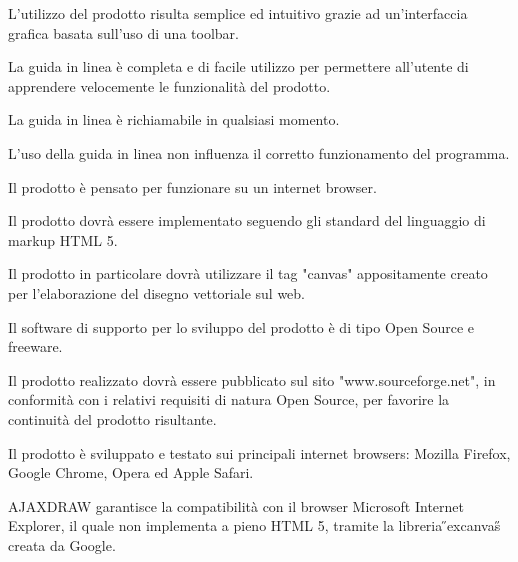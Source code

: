 \begin{elenconumerato}{\subsubsecindent}
\item L'utilizzo del prodotto risulta semplice ed intuitivo grazie ad un'interfaccia grafica basata sull'uso di una toolbar.
\item La guida in linea \`e completa e di facile utilizzo per permettere all'utente di apprendere velocemente le funzionalit\`a del prodotto.
\item La guida in linea \`e richiamabile in qualsiasi momento.
\item L'uso della guida in linea non influenza il corretto funzionamento del programma. 
\end{elenconumerato}

\begin{elenconumerato}{\subsubsecindent}
\item Il prodotto \`e pensato per funzionare su un internet browser.
\item Il prodotto dovr\`a essere implementato seguendo gli standard del linguaggio di markup HTML 5.
\item Il prodotto in particolare dovr\` a utilizzare il tag "canvas" appositamente creato per l'elaborazione del disegno vettoriale sul web.
\item Il software di supporto per lo sviluppo del prodotto \`e di tipo Open Source e freeware.
\item Il prodotto realizzato dovr\`a essere pubblicato sul sito "www.sourceforge.net", in conformit\`a con i relativi requisiti di natura Open Source, per favorire la continuit\`a del prodotto risultante.
\item Il prodotto \`e sviluppato e testato sui principali internet browsers: Mozilla Firefox, Google Chrome, Opera ed Apple Safari.
\end{elenconumerato}
\begin{elenconumerato}{\subsubsecindent}
\item{AJAXDRAW garantisce la compatibilit\`a con il browser Microsoft Internet Explorer, il quale non implementa a pieno HTML 5, tramite la libreria \H{}excanvas\H{} creata da Google.}
\end{elenconumerato}


\newpage
